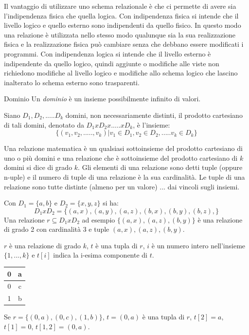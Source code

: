  Il vantaggio di utilizzare uno schema relazionale è che ci permette di avere sia l'indipendenza fisica che quella logica. Con indipendenza fisica si intende che il livello logico e quello esterno sono indipendenti da quello fisico. In questo modo una relazione è utilizzata nello stesso modo qualunque sia la sua realizzazione fisica e la realizzazione fisica può cambiare senza che debbano essere modificati i programmi. Con indipendenza logica si intende che il livello esterno è indipendente da quello logico, quindi aggiunte o modifiche alle viste non richiedono modifiche al livello logico e modifiche allo schema logico che lascino inalterato lo
schema esterno sono trasparenti.

\begin{Definition}{Dominio}{}
    Un \textit{dominio} è un insieme possibilmente infinito di valori.

    Siano $D_1,D_2,.....D_k$ domini, non necessariamente distinti, il prodotto cartesiano di tali domini, denotato da $D_1 x D_2 x..... x D_k$, è l'insieme:
    \begin{equation*}
        \{(v_1, v_2, ....., v_k) | v_1\in D_1, v_2\in D_2, ..... v_k\in D_k\}
    \end{equation*}

    Una relazione matematica è un qualsiasi sottoinsieme del prodotto cartesiano di uno o più domini e una relazione che è sottoinsieme del prodotto cartesiano di $k$ domini si dice di grado $k$. Gli elementi di una relazione sono detti tuple (oppure n-uple) e il numero di tuple di una relazione è la sua cardinalità. Le tuple di una relazione sono tutte distinte (almeno per un valore) ... dai vincoli sugli insiemi.

    \begin{example}
        Con $D_1=\{a,b\}$ e $D_2=\{x,y,z\}$ si ha:
        \begin{equation*}
            D_1xD_2=\{(a,x),(a,y),(a,z),(b,x),(b,y),(b,z),\}
        \end{equation*}
        Una relazione $r\subseteq D_1xD_2$ ad esempio $\{(a,x),(a,z),(b,y)\}$ è una relazione di grado 2 con cardinalità 3 e tuple $(a,x),(a,z),(b,y)$.
    \end{example}
\end{Definition}

\begin{Notation}{}{}
    $r$ è una relazione di grado $k$, $t$ è una tupla di $r$, $i$ è un numero intero nell'insieme $\{1,...,k\}$ e $t[i]$ indica la i-esima componente di $t$.
    \begin{example}\phantom{}
        \begin{center}
        \begin{tabular}{|c|c|}
            \hline 0 & a\\\hline 
            0 & c\\\hline 
            1 & b\\\hline 
        \end{tabular}
    \end{center}
    Se $r=\{(0,a), (0,c),(1,b)\}$, $t=(0,a)$ è una tupla di $r$, $t[2]=a$, $t[1] = 0$, $t[1,2] = (0, a)$.
    \end{example}
\end{Notation}

